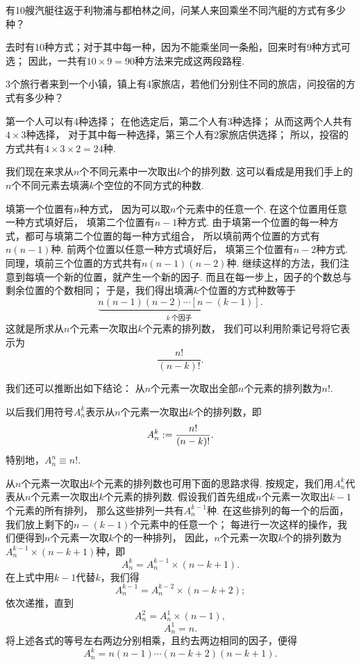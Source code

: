 \begin{example}
有10艘汽艇往返于利物浦与都柏林之间，问某人来回乘坐不同汽艇的方式有多少种？
\begin{solution}
去时有10种方式；对于其中每一种，因为不能乘坐同一条船，回来时有9种方式可选；
因此，一共有\(10 \times 9 = 90\)种方法来完成这两段路程.
\end{solution}
\end{example}

\begin{example}
3个旅行者来到一个小镇，镇上有4家旅店，若他们分别住不同的旅店，问投宿的方式有多少种？
\begin{solution}
第一个人可以有4种选择；
在他选定后，第二个人有3种选择；
从而这两个人共有\(4 \times 3\)种选择，
对于其中每一种选择，第三个人有2家旅店供选择；
所以，投宿的方式共有\(4 \times 3 \times 2 = 24\)种.
\end{solution}
\end{example}

我们现在来求从\(n\)个不同元素中一次取出\(k\)个的排列数.
这可以看成是用我们手上的\(n\)个不同元素去填满\(k\)个空位的不同方式的种数.

填第一个位置有\(n\)种方式，
因为可以取\(n\)个元素中的任意一个.
在这个位置用任意一种方式填好后，
填第二个位置有\(n-1\)种方式.
由于填第一个位置的每一种方式，都可与填第二个位置的每一种方式组合，
所以填前两个位置的方式有\(n(n-1)\)种.
前两个位置以任意一种方式填好后，
填第三个位置有\(n-2\)种方式.
同理，填前三个位置的方式共有\(n(n-1)(n-2)\)种.
继续这样的方法，我们注意到每填一个新的位置，就产生一个新的因子.
而且在每一步上，因子的个数总与剩余位置的个数相同；
于是，我们得出填满\(k\)个位置的方式种数等于\[
	\underbrace{n(n-1)(n-2)\dotsm[n-(k-1)]}_{k\ \text{个因子}}.
\]
这就是所求从\(n\)个元素一次取出\(k\)个元素的排列数，
我们可以利用阶乘记号将它表示为\[
	\frac{n!}{(n-k)!}.
\]

我们还可以推断出如下结论：
从\(n\)个元素一次取出全部\(n\)个元素的排列数为\(n!\).

以后我们用符号\(A_n^k\)表示从\(n\)个元素一次取出\(k\)个的排列数，即\begin{equation}
	A_n^k := \frac{n!}{(n-k)!}.
\end{equation}
特别地，\(A_n^n \equiv n!\).

从\(n\)个元素一次取出\(k\)个元素的排列数也可用下面的思路求得.
按规定，我们用\(A_n^k\)代表从\(n\)个元素一次取出\(k\)个元素的排列数.
假设我们首先组成\(n\)个元素一次取出\(k-1\)个元素的所有排列，
那么这些排列一共有\(A_n^{k-1}\)种.
在这些排列的每一个的后面，我们放上剩下的\(n-(k-1)\)个元素中的任意一个；
每进行一次这样的操作，我们便得到\(n\)个元素一次取\(k\)个的一种排列，
因此，\(n\)个元素一次取\(k\)个的排列数为\(A_n^{k-1} \times (n-k+1)\)种，即\[
	A_n^k = A_n^{k-1} \times (n-k+1).
\]
在上式中用\(k-1\)代替\(k\)，我们得\[
	A_n^{k-1} = A_n^{k-2} \times (n-k+2);
\]
依次递推，直到\[
	A_n^2 = A_n^1 \times (n-1),
\]\[
	A_n^1 = n.
\]
将上述各式的等号左右两边分别相乘，且约去两边相同的因子，便得\[
	A_n^k = n(n-1)\dotsm(n-k+2)(n-k+1).
\]


